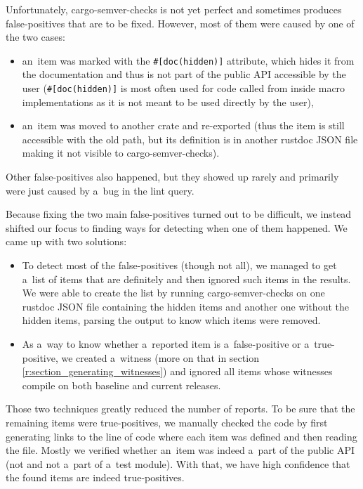 \documentclass[licencjacka,en]{pracamgr}
\begin{document}
Unfortunately, cargo-semver-checks is not yet perfect and sometimes produces false-positives
that are to be fixed. However, most of them were caused by one of the two cases:
\begin{itemize}
	\item an~item was marked with the \texttt{\#[doc(hidden)]} attribute,
		which hides it from the documentation and thus is not part
		of the public API accessible by the user
		(\texttt{\#[doc(hidden)]} is most often used for code called from inside macro implementations
		as it is not meant to be used directly by the user),
	\item an~item was moved to another crate and re-exported
		(thus the item is still accessible with the old path,
		but its definition is in another rustdoc JSON file making it not visible to cargo-semver-checks).
\end{itemize}
Other false-positives also happened, but they showed up rarely and primarily
were just caused by a~bug in the lint query.

Because fixing the two main false-positives turned out to be difficult, we instead shifted our focus
to finding ways for detecting when one of them happened.
We came up with two solutions:
\begin{itemize}
	\item To detect most of the  false-positives
		(though not all), we managed to get a~list of items that are definitely
		 and then ignored such items in the results.
		We were able to create the list by running cargo-semver-checks on one rustdoc JSON file
		containing the hidden items and another one without the hidden items,
		parsing the output to know which items were removed.
	\item As a~way to know whether a~reported item is a~false-positive or a~true-positive,
		we created a~witness (more on that in section \ref{r:section_generating_witnesses})
		and ignored all items whose witnesses compile on both baseline and current releases.
\end{itemize}

Those two techniques greatly reduced the number of reports.
To be sure that the remaining items were true-positives,
we manually checked the code by first generating links to the line of code where each item was defined
and then reading the file.
Mostly we verified whether an~item was indeed a~part of the public API
(not  and not a~part of a~test module).
With that, we have high confidence that the found items are indeed true-positives.
\end{document}
